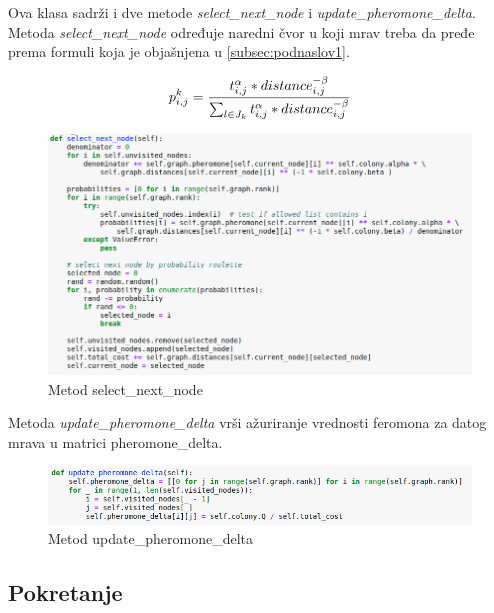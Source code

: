 \documentclass[a4paper]{article}
\begin{document}
Ova klasa sadrži i dve metode \textit{select\_next\_node} i \textit{update\_pheromone\_delta}.
Metoda \textit{select\_next\_node} određuje naredni čvor u koji mrav treba da pređe prema formuli koja je objašnjena u \ref{subsec:podnaslov1}. 

\begin{equation}\label{1}
p_{i,j}^k = {t_{i,j}^\alpha * distance_{i,j}^{-\beta} \over \sum_{l \in J_k}^{} t_{i,j}^\alpha * distance_{i,j}^{-\beta}}
\end{equation}

\begin{figure}[h!]
\begin{center}
\includegraphics[width=1\columnwidth]{slika6.png}
\end{center}
\caption{Metod select\_next\_node}
\label{fig:slika5}
\end{figure}

Metoda \textit{update\_pheromone\_delta} vrši ažuriranje vrednosti feromona
za datog mrava u matrici pheromone\_delta.

\begin{figure}[h!]
\begin{center}
\includegraphics[width=1\columnwidth]{slika7.png}
\end{center}
\caption{Metod update\_pheromone\_delta}
\label{fig:slika5}
\end{figure}

\subsection{Pokretanje}
\label{pokretanje}
\end{document}
